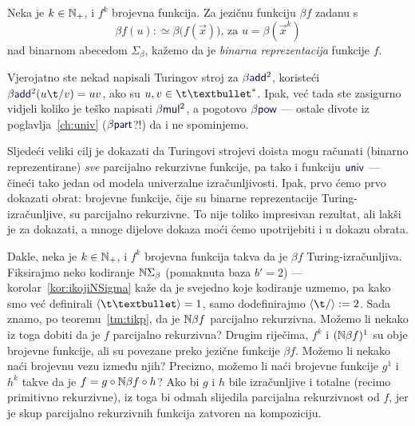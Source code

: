 \begin{definicija}
Neka je $k\in{\mathbb N}_+$, i $f^k$ brojevna funkcija. Za jezičnu funkciju $\beta f$ zadanu s \begin{equation}\label{eq:betaf}
    \beta f(u):\simeq\beta\bigl(f(\vec x)\bigr)\text{, za } u=\beta(\vec x^k)
\end{equation}
nad binarnom abecedom $\Sigma_\beta$, kažemo da je \emph{binarna reprezentacija} funkcije $f$.
\end{definicija}

Vjerojatno ste nekad napisali Turingov stroj za $\beta\f{add}^2$, koristeći $\beta\f{add}^2(u\t/v)=uv$, ako su $u,v\in\t\textbullet^*$. Ipak, već tada ste zasigurno vidjeli koliko je teško napisati $\beta\f{mul}^2$, a pogotovo $\beta\f{pow}$ --- ostale divote iz poglavlja~\ref{ch:univ} ($\beta\f{part}$?!) da i ne spominjemo.

Sljedeći veliki cilj je dokazati da Turingovi strojevi doista mogu računati (binarno reprezentirane) \emph{sve} parcijalno rekurzivne funkcije, pa tako i funkciju $\f{univ}$ --- čineći tako jedan od modela univerzalne izračunljivosti. Ipak, prvo ćemo prvo dokazati obrat: brojevne funkcije, čije su binarne reprezentacije Turing-izračunljive, su parcijalno rekurzivne. To nije toliko impresivan rezultat, ali lakši je za dokazati, a mnoge dijelove dokaza moći ćemo upotrijebiti i u dokazu obrata.


Dakle, neka je $k\in{\mathbb N}_+$, i $f^k$ brojevna funkcija takva da je $\beta f$ Turing-izračunljiva. Fiksirajmo neko kodiranje ${\mathbb N}\Sigma_\beta$ (pomaknuta baza $b'=2$) --- korolar~\ref{kor:ikojiNSigma} kaže da je svejedno koje kodiranje uzmemo, pa kako smo već definirali $\kr{\t\textbullet}=1$, samo dodefinirajmo $\kr{\t/}:=2$.
Sada znamo, po teoremu~\ref{tm:tikp}, da je ${\mathbb N}\beta f$ parcijalno rekurzivna. Možemo li nekako iz toga dobiti da je $f$ parcijalno rekurzivna? Drugim riječima, $f^k$ i $({\mathbb N}\beta f)^1$ su obje brojevne funkcije, ali su povezane preko jezične funkcije $\beta f$. Možemo li nekako naći brojevnu vezu između njih? Precizno, možemo li naći brojevne funkcije $g^1$ i $h^k$ takve da je $f=g\circ{\mathbb N}\beta f\circ h$? Ako bi $g$ i $h$ bile izračunljive i totalne (recimo primitivno rekurzivne), iz toga bi odmah slijedila parcijalna rekurzivnost od $f$, jer je skup parcijalno rekurzivnih funkcija zatvoren na kompoziciju.

